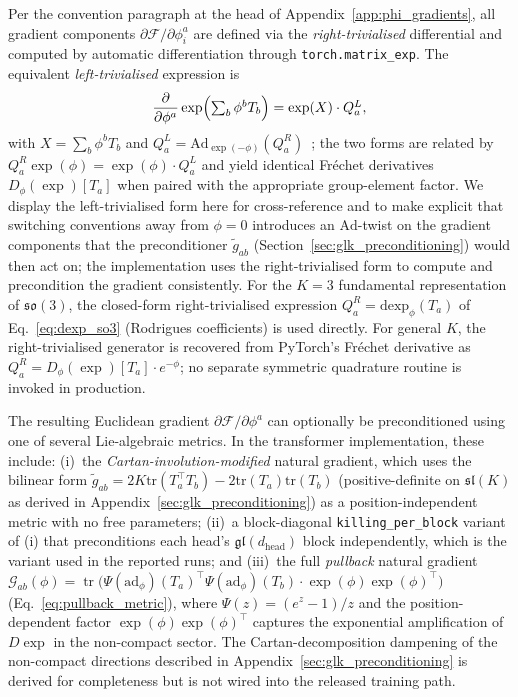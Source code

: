 \documentclass[twoside,11pt]{article}
\begin{document}
Per the convention paragraph at the head of Appendix~\ref{app:phi_gradients}, all gradient components $\partial \mathcal{F}/\partial \phi_i^a$ are defined via the \emph{right-trivialised} differential and computed by automatic differentiation through \texttt{torch.matrix\_exp}. The equivalent \emph{left-trivialised} expression is
\begin{equation}
\frac{\partial}{\partial \phi^a}\exp \Bigl(\textstyle\sum_b \phi^b T_b\Bigr) = \exp(X)\cdot Q_a^{L},
\end{equation}
with $X = \sum_b \phi^b T_b$ and $Q_a^{L} = \mathrm{Ad}_{\exp(-\phi)}(Q_a^{R})$~\citep{Hall2015}; the two forms are related by $Q_a^{R} \exp(\phi) = \exp(\phi) \cdot Q_a^{L}$ and yield identical Fr\'echet derivatives $D_\phi(\exp)[T_a]$ when paired with the appropriate group-element factor. We display the left-trivialised form here for cross-reference and to make explicit that switching conventions away from $\phi=0$ introduces an $\mathrm{Ad}$-twist on the gradient components that the preconditioner $\tilde g_{ab}$ (Section~\ref{sec:glk_preconditioning}) would then act on; the implementation uses the right-trivialised form to compute and precondition the gradient consistently. For the $K = 3$ fundamental representation of $\mathfrak{so}(3)$, the closed-form right-trivialised expression $Q_a^{R} = \mathrm{dexp}_\phi(T_a)$ of Eq.~\eqref{eq:dexp_so3} (Rodrigues coefficients) is used directly. For general $K$, the right-trivialised generator is recovered from PyTorch's Fr\'echet derivative as $Q_a^{R} = D_\phi(\exp)[T_a]\cdot e^{-\phi}$; no separate symmetric quadrature routine is invoked in production.

The resulting Euclidean gradient $\partial\mathcal{F}/\partial\phi^a$ can optionally be preconditioned using one of several Lie-algebraic metrics. In the transformer implementation, these include: (i)~the \emph{Cartan-involution-modified} natural gradient, which uses the bilinear form $\tilde{g}_{ab} = 2K \mathrm{tr}(T_a^\top T_b) - 2 \mathrm{tr}(T_a)\mathrm{tr}(T_b)$ (positive-definite on $\mathfrak{sl}(K)$ as derived in Appendix~\ref{sec:glk_preconditioning}) as a position-independent metric with no free parameters; (ii)~a block-diagonal \texttt{killing\_per\_block} variant of (i) that preconditions each head's $\mathfrak{gl}(d_{\mathrm{head}})$ block independently, which is the variant used in the reported runs; and (iii)~the full \emph{pullback} natural gradient $\mathcal{G}_{ab}(\phi) = \operatorname{tr}\bigl(\Psi(\mathrm{ad}_\phi)(T_a)^\top \Psi(\mathrm{ad}_\phi)(T_b) \cdot \exp(\phi)\exp(\phi)^\top\bigr)$ (Eq.~\ref{eq:pullback_metric}), where $\Psi(z) = (e^z - 1)/z$ and the position-dependent factor $\exp(\phi)\exp(\phi)^\top$ captures the exponential amplification of $D\exp$ in the non-compact sector. The Cartan-decomposition dampening of the non-compact directions described in Appendix~\ref{sec:glk_preconditioning} is derived for completeness but is not wired into the released training path.
\end{document}
